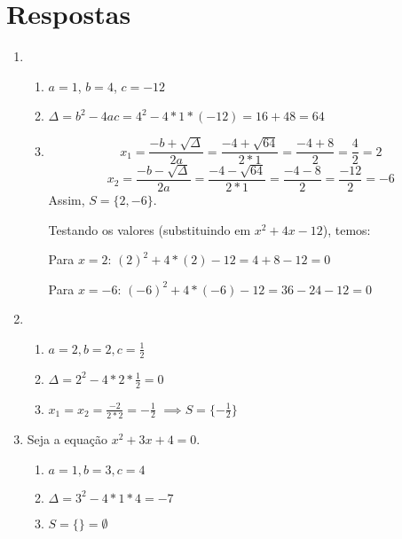 \documentclass[11pt]{article}
\begin{document}
\section{Respostas}
\begin{enumerate}
	\item
		\begin{enumerate}
			\item $a = 1$, $b = 4$, $c = -12$
			\item $\Delta = b^2 - 4ac = 4^2 - 4*1*(-12) = 16 + 48 = 64$
			\item $$x_1 = \frac{-b + \sqrt{\Delta}}{2a} = \frac{-4 + 
				\sqrt{64}}{2*1} = \frac{-4 + 8}{2} = \frac{4}{2} = 2$$
				$$x_2 = \frac{-b - \sqrt{\Delta}}{2a} = \frac{-4 - 
				\sqrt{64}}{2*1} = \frac{-4 - 8}{2} = \frac{-12}{2} = -6$$
				Assim, $S = \{2, -6\}$.
				\par Testando os valores (substituindo em $x^2+4x-12$), temos: 
				\par Para $x=2$: ${(2)}^2 + 4*(2) - 12 = 4 + 8 - 12 = 0$	
				\par Para $x=-6$: ${(-6)}^2 + 4*(-6) - 12 = 36 - 24 - 12 = 0$	
		\end{enumerate}

	\item 
		\begin{enumerate}
			\item $a = 2, b = 2, c = \frac{1}{2}$
			\item $\Delta = 2^2 - 4*2*\frac{1}{2} = 0$
			\item $x_1 = x_2 = \frac{-2}{2*2} = -\frac{1}{2}$
				$\implies S = \{-\frac{1}{2}\}$
		\end{enumerate}

	\item Seja a equação $x^2 + 3x + 4 = 0$.
	\begin{enumerate}
		\item $a=1, b=3, c=4$
		\item $\Delta = 3^2 - 4*1*4 = -7$
		\item $S = \{\} = \emptyset$
	\end{enumerate}
\end{enumerate}
\end{document}
